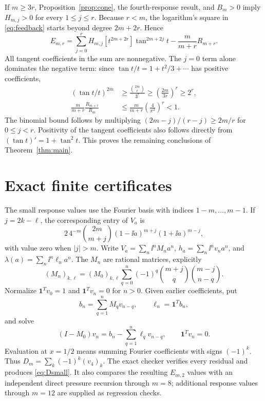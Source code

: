 \documentclass[11pt,a4paper]{article}
\theoremstyle{remark}\newtheorem*{ednote}{Editorial note (ProveIt, 2026-10-01)}
\begin{document}
If $m\ge3r$, Proposition~\ref{prop:cone}, the fourth-response result, and $B_m>0$ imply $H_{m,j}>0$ for every $1\le j\le r$. Because $r<m$, the logarithm's square in \eqref{eq:feedback} starts beyond degree $2m+2r$. Hence
\begin{equation}\label{eq:pressuregeneral}
 E_{m,r}=\sum_{j=0}^r H_{m,j}
       [t^{2m+2r}]\tan^{2m+2j}t
       -\frac{m}{m+r}R_{m+r}.
\end{equation}
All tangent coefficients in the sum are nonnegative. The $j=0$ term alone dominates the negative term: since $\tan t/t=1+t^2/3+\cdots$ has positive coefficients,
\begin{align*}
 [t^{2r}](\tan t/t)^{2m}
 &\ge\frac{\binom{2m}{r}}{3^r}
 \ge\left(\frac{2m}{3r}\right)^r\ge2^r,\\
 \frac{m}{m+r}\frac{R_{m+r}}{R_m}
 &\le\frac{m}{m+r}\left(\frac4{\pi^2}\right)^r<1.
\end{align*}
The binomial bound follows by multiplying $(2m-j)/(r-j)\ge2m/r$ for $0\le j<r$. Positivity of the tangent coefficients also follows directly from $(\tan t)'=1+\tan^2t$. This proves the remaining conclusions of Theorem~\ref{thm:main}.

\section{Exact finite certificates}\label{sec:exact}
The small response values use the Fourier basis with indices $1-m,\ldots,m-1$. If $j=2k-\ell$, the corresponding entry of $V_a$ is
\begin{equation}\label{eq:matrix}
 2\,4^{-m}\binom{2m}{m+j}
        (1-\ii a)^{m+j}(1+\ii a)^{m-j},
\end{equation}
with value zero when $|j|>m$. Write $V_a=\sum_n\ii^n M_na^n$, $h_a=\sum_n\ii^n v_na^n$, and $\lambda(a)=\sum_n\ii^n\ell_na^n$. The $M_n$ are rational matrices, explicitly
\[
 (M_n)_{k,\ell}=(M_0)_{k,\ell}
 \sum_{q=0}^n(-1)^q\binom{m+j}{q}\binom{m-j}{n-q}.
\]
Normalize $\boldsymbol1^Tv_0=1$ and $\boldsymbol1^Tv_n=0$ for $n>0$. Given earlier coefficients, put
\[
 b_n=\sum_{q=1}^nM_qv_{n-q},\qquad \ell_n=\boldsymbol1^Tb_n,
\]
and solve
\begin{equation}\label{eq:recursion}
 (I-M_0)v_n=b_n-\sum_{q=1}^n\ell_qv_{n-q},
 \qquad\boldsymbol1^Tv_n=0.
\end{equation}
Evaluation at $x=1/2$ means summing Fourier coefficients with signs $(-1)^k$. Thus $D_m=\sum_k(-1)^k(v_4)_k$. The exact checker verifies every residual and produces \eqref{eq:Dsmall}. It also compares the resulting $E_{m,2}$ values with an independent direct pressure recursion through $m=8$; additional response values through $m=12$ are supplied as regression checks.
\end{document}
